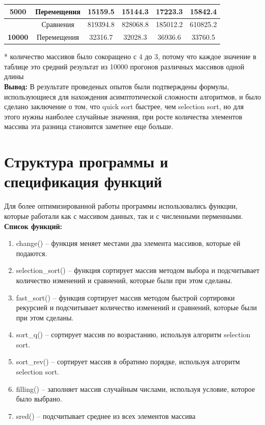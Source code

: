 \documentclass[a4paper,11pt]{article}
\begin{document}
\begin{table}[H]
\begin{tabular}{|c|c|c|c|c|c|}
        \multirow{-2}{*}{{\color[HTML]{3F3B42} \textbf{5000}}}  & Перемещения               & 15159.5    & 15144.3    & 17223.3    & 15842.4                   \\ \hline
        {\color[HTML]{3F3B42} }                                 & Сравнения                 & 819394.8   & 828068.8   & 185012.2   & 610825.2                  \\ \cline{2-6} 
        \multirow{-2}{*}{{\color[HTML]{3F3B42} \textbf{10000}}} & Перемещения               & 32316.7    & 32028.3    & 36936.6    & 33760.5                   \\ \hline
        \end{tabular}
    \end{table}
    * количество массивов было сокоращено с 4 до 3, потому что каждое значение в таблице это средний результат из 10000 прогонов различных массивов одной длины\\

    \large{\textbf{Вывод:}} 
    В результате проведеных опытов были подтверждены формулы, использующиеся для нахождения асимптотической сложности алгоритмов, и было сделано заключение о том, что quick sort быстрее, чем selection sort, но для этого нужны наиболее случайные значения, при росте количества элементов массива эта разница становится заметнее еще больше.


    \newpage
    \section{Структура программы и спецификация функций}
    \vspace{0,5cm}
    Для более оптимизированной работы программы использовались функции, которые работали как с массивом данных, так и с численными перменными.
    \vspace{0.9cm}\\
    \textbf{Список функций:}\\
    \begin{enumerate}
        \item change() -- функция меняет местами два элемента массивов, которые ей подаются.
        \item selection\_sort() -- функция сортирует массив методом выбора и подсчитывает количество изменений и сравнений, которые были при этом сделаны.
        \item fast\_sort() -- функция сортирует массив методом быстрой сортировки рекурсией и подсчитывает количество изменений и сравнений, которые были при этом сделаны.
        \item sort\_q() -- сортирует массив по возрастанию, используя алгоритм selection sort.
        \item sort\_rev() -- сортирует массив в обратнмо порядке, используя алгоритм selection sort.
        \item filling() -- заполняет массив случайным числами, используя условие, которое было выбрано.
        \item sred() -- подсчитывает среднее из всех элементов массива
    \end{enumerate}
    \newpage
\end{document}
